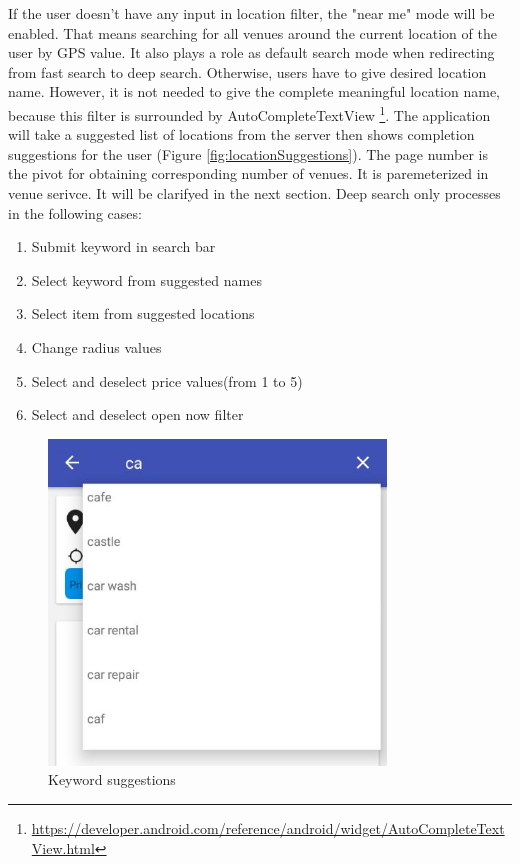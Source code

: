 If the user doesn't have any input in location filter, the "near me" mode will be enabled. That means searching for all venues around the current location of the user by GPS value. It also plays a role as default search mode when redirecting from fast search to deep search. Otherwise, users have to give desired location name. However, it is not needed to give the complete meaningful location name, because this filter is surrounded by AutoCompleteTextView \footnote{\url{https://developer.android.com/reference/android/widget/AutoCompleteTextView.html}}. The application will take a suggested list of locations from the server then shows completion suggestions for the user (Figure \ref{fig:locationSuggestions}).
The page number is the pivot for obtaining corresponding number of venues. It is paremeterized in venue serivce. It will be clarifyed in the next section.
Deep search only processes in the following cases:
\begin{enumerate}
	\item Submit keyword in search bar
	\item Select keyword from suggested names
	\item Select item from suggested locations
	\item Change radius values
	\item Select and deselect price values(from 1 to 5)
	\item Select and deselect open now filter
\end{enumerate}


\begin{figure}[htbp]
	\includegraphics[width=0.8\textwidth]{images/suggestedkeywords.jpg}
	\centering
	\caption[]{Keyword suggestions}
	\label{fig:keywordSuggestions}
\end{figure} 

